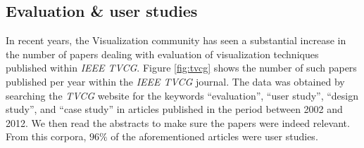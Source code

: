 







\subsection{Evaluation \& user studies}

In recent years, the Visualization community has seen a substantial increase in the number of papers dealing with evaluation of visualization techniques published within {\em IEEE TVCG}.  Figure \ref{fig:tvcg} shows the number of such papers published per year within the {\em IEEE TVCG} journal. The data was obtained by searching the {\em TVCG} website for the keywords ``evaluation'', ``user study'', ``design study'', and ``case study'' in articles published in the period between 2002 and 2012. We then read the abstracts to make sure the papers were indeed relevant. From this corpora, $96\%$ of the aforementioned articles were user studies.


